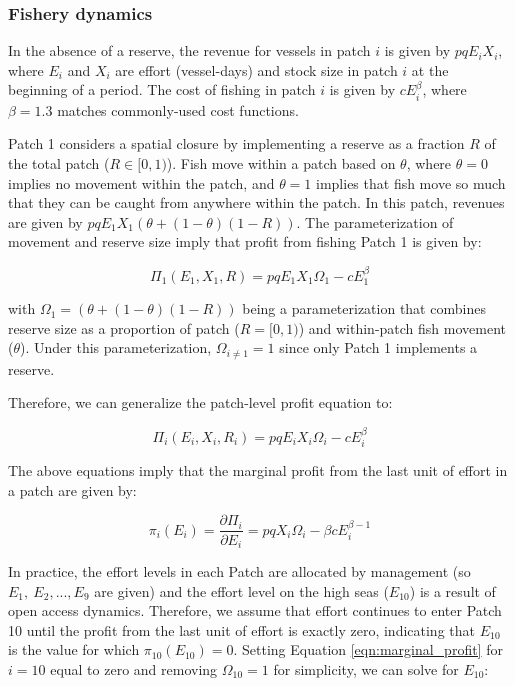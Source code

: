 \documentclass[12pt]{article}
\begin{document}
\subsubsection{Fishery dynamics}

In the absence of a reserve, the revenue for vessels in patch $i$ is given by $pqE_iX_i$, where $E_i$ and $X_i$ are effort (vessel-days) and stock size in patch $i$ at the beginning of a period. The cost of fishing in patch $i$ is given by $cE_i^\beta$, where $\beta = 1.3$ matches commonly-used cost functions.

Patch 1 considers a spatial closure by implementing a reserve as a fraction $R$ of the total patch ($R \in[0,1)$). Fish move within a patch based on $\theta$, where $\theta = 0$ implies no movement within the patch, and $\theta = 1$ implies that fish move so much that they can be caught from anywhere within the patch. In this patch, revenues are given by $pqE_1X_1(\theta + (1 - \theta)(1 - R))$. The parameterization of movement and reserve size imply that profit from fishing Patch 1 is given by:

$$
\Pi_1(E_1,X_1,R) = pqE_1X_1\Omega_1-cE_1^\beta
$$

\noindent with $\Omega_1 = (\theta + (1 - \theta)(1 - R))$ being a parameterization that combines reserve size as a proportion of patch ($R =  [0, 1)$) and within-patch fish movement ($\theta$). Under this parameterization, $\Omega_{i \neq 1} = 1$ since only Patch 1 implements a reserve.

Therefore, we can generalize the patch-level profit equation to:

$$
\Pi_i(E_i,X_i, R_i) = pqE_iX_i\Omega_i-cE_i^\beta
$$

\noindent The above equations imply that the marginal profit from the last unit of effort in a patch are given by:

\begin{equation}
\pi_i(E_i) = \frac{\partial \Pi_i}{\partial E_i} = pqX_i\Omega_i - \beta cE_i^{\beta-1}
\label{eqn:marginal_profit}
\end{equation}

In practice, the effort levels in each Patch are allocated by management (so $E_{1},\ E_{2},...,E_{9}$ are given) and the
effort level on the high seas ($E_{10}$) is a result of open access dynamics. Therefore, we assume that effort continues to enter Patch 10 until the profit from the last unit of effort is exactly zero, indicating that $E_{10}$ is the value for which $\pi_{10}(E_{10})  = 0$. Setting Equation \ref{eqn:marginal_profit} for $i = 10$ equal to zero and removing $\Omega_{10} = 1$ for simplicity, we can solve for $E_{10}$:
\end{document}
